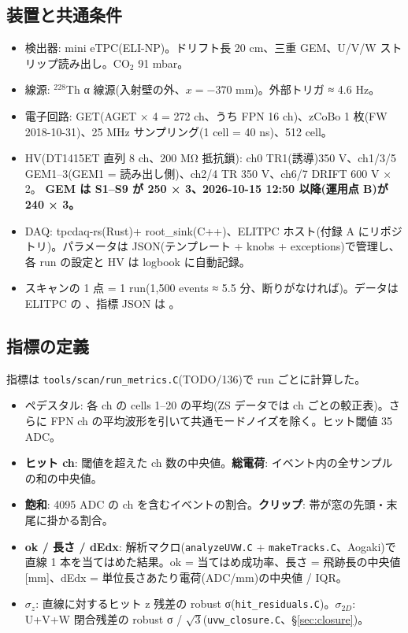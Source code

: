\documentclass[a4paper,11pt]{ltjsarticle}
\begin{document}
\subsection{装置と共通条件}
\begin{itemize}
\item 検出器: mini eTPC(ELI-NP)。ドリフト長 20 cm、三重 GEM、U/V/W ストリップ読み出し。CO$_2$ 91 mbar。
\item 線源: $^{228}$Th α 線源(入射壁の外、$x = -370$ mm)。外部トリガ ≈ 4.6 Hz。
\item 電子回路: GET(AGET × 4 = 272 ch、うち FPN 16 ch)、zCoBo 1 枚(FW 2018-10-31)、25 MHz サンプリング(1 cell = 40 ns)、512 cell。
\item HV(DT1415ET 直列 8 ch、200 MΩ 抵抗鎖): ch0 TR1(誘導)350 V、ch1/3/5 GEM1--3(GEM1 = 読み出し側)、ch2/4 TR 350 V、ch6/7 DRIFT 600 V × 2。
  \textbf{GEM は S1--S9 が 250 × 3、2026-10-15 12:50 以降(運用点 B)が 240 × 3。}
\item DAQ: tpcdaq-rs(Rust)+ root\_sink(C++)、ELITPC ホスト(付録 A にリポジトリ)。パラメータは JSON(テンプレート + knobs + exceptions)で管理し、各 run の設定と HV は logbook に自動記録。
\item スキャンの 1 点 = 1 run(1,500 events ≈ 5.5 分、断りがなければ)。データは ELITPC の 、指標 JSON は 。
\end{itemize}

\subsection{指標の定義}
指標は \texttt{tools/scan/run\_metrics.C}(TODO/136)で run ごとに計算した。
\begin{itemize}
\item ペデスタル: 各 ch の cells 1--20 の平均(ZS データでは ch ごとの較正表)。さらに FPN ch の平均波形を引いて共通モードノイズを除く。ヒット閾値 35 ADC。
\item \textbf{ヒット ch}: 閾値を超えた ch 数の中央値。\textbf{総電荷}: イベント内の全サンプルの和の中央値。
\item \textbf{飽和}: 4095 ADC の ch を含むイベントの割合。\textbf{クリップ}: 帯が窓の先頭・末尾に掛かる割合。
\item \textbf{ok / 長さ / dEdx}: 解析マクロ(\texttt{analyzeUVW.C} + \texttt{makeTracks.C}、Aogaki)で直線 1 本を当てはめた結果。ok = 当てはめ成功率、長さ = 飛跡長の中央値 [mm]、dEdx = 単位長さあたり電荷(ADC/mm)の中央値 / IQR。
\item $\sigma_z$: 直線に対するヒット z 残差の robust σ(\texttt{hit\_residuals.C})。$\sigma_{2D}$: U+V+W 閉合残差の robust σ / $\sqrt{3}$(\texttt{uvw\_closure.C}、§\ref{sec:closure})。
\end{itemize}
\end{document}
